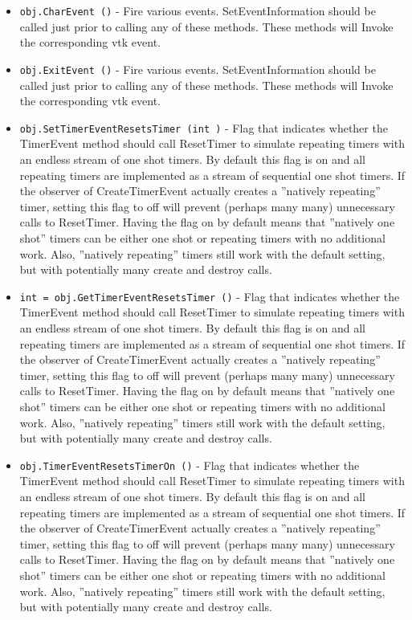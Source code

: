 \begin{itemize}
\item  \verb|obj.CharEvent ()| -  Fire various events. SetEventInformation should be called just prior
 to calling any of these methods. These methods will Invoke the
 corresponding vtk event.

\item  \verb|obj.ExitEvent ()| -  Fire various events. SetEventInformation should be called just prior
 to calling any of these methods. These methods will Invoke the
 corresponding vtk event.

\item  \verb|obj.SetTimerEventResetsTimer (int )| -  Flag that indicates whether the TimerEvent method should call ResetTimer
 to simulate repeating timers with an endless stream of one shot timers.
 By default this flag is on and all repeating timers are implemented as a
 stream of sequential one shot timers. If the observer of
 CreateTimerEvent actually creates a ''natively repeating'' timer, setting
 this flag to off will prevent (perhaps many many) unnecessary calls to
 ResetTimer. Having the flag on by default means that ''natively one
 shot'' timers can be either one shot or repeating timers with no
 additional work. Also, ''natively repeating'' timers still work with the
 default setting, but with potentially many create and destroy calls.

\item  \verb|int = obj.GetTimerEventResetsTimer ()| -  Flag that indicates whether the TimerEvent method should call ResetTimer
 to simulate repeating timers with an endless stream of one shot timers.
 By default this flag is on and all repeating timers are implemented as a
 stream of sequential one shot timers. If the observer of
 CreateTimerEvent actually creates a ''natively repeating'' timer, setting
 this flag to off will prevent (perhaps many many) unnecessary calls to
 ResetTimer. Having the flag on by default means that ''natively one
 shot'' timers can be either one shot or repeating timers with no
 additional work. Also, ''natively repeating'' timers still work with the
 default setting, but with potentially many create and destroy calls.

\item  \verb|obj.TimerEventResetsTimerOn ()| -  Flag that indicates whether the TimerEvent method should call ResetTimer
 to simulate repeating timers with an endless stream of one shot timers.
 By default this flag is on and all repeating timers are implemented as a
 stream of sequential one shot timers. If the observer of
 CreateTimerEvent actually creates a ''natively repeating'' timer, setting
 this flag to off will prevent (perhaps many many) unnecessary calls to
 ResetTimer. Having the flag on by default means that ''natively one
 shot'' timers can be either one shot or repeating timers with no
 additional work. Also, ''natively repeating'' timers still work with the
 default setting, but with potentially many create and destroy calls.


\end{itemize}
